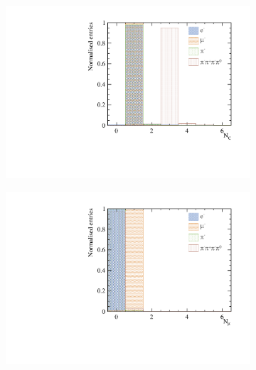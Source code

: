 \begin{figure}[htbp]
\centering
\begin{subfigure}[b]{0.45\textwidth}
 \includegraphics[width=\textwidth]{tau/nCharge_100GeV_improved.pdf}
  \caption{}
  \label{fig:tauVarNCharge}
\end{subfigure}
\begin{subfigure}[b]{0.45\textwidth}
 \includegraphics[width=\textwidth]{tau/nMuon_100GeV_improved.pdf}
  \caption{}
  \label{fig:tauVarNMuon}
\end{subfigure}
\begin{subfigure}[b]{0.45\textwidth}

\end{subfigure}
\end{figure}
